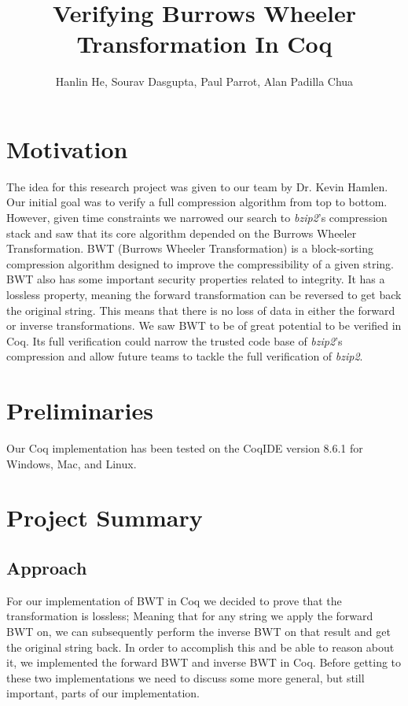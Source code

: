 \documentclass[11pt,letterpaper,]{article}
\title{Verifying Burrows Wheeler Transformation In Coq}
\author{Hanlin He, Sourav Dasgupta, Paul Parrot, Alan Padilla Chua}
\begin{document}
\maketitle

\section{Motivation}

The idea for this research project was given to our team by Dr. Kevin Hamlen.
Our initial goal was to verify a full compression algorithm from top to bottom.
However, given time constraints we narrowed our search to \emph{bzip2}'s
compression stack and saw that its core algorithm depended on the Burrows
Wheeler Transformation\cite{bzip2}. BWT (Burrows Wheeler Transformation) is a
block-sorting compression algorithm designed to improve the compressibility of
a given string. BWT also has some important security properties related to
integrity. It has a lossless property, meaning the forward transformation can
be reversed to get back the original string. This means that there is no loss
of data in either the forward or inverse transformations. We saw BWT to be of
great potential to be verified in Coq. Its full verification could narrow the
trusted code base of \emph{bzip2}'s compression and allow future teams to
tackle the full verification of \emph{bzip2}.

\section{Preliminaries}

Our Coq implementation has been tested on the CoqIDE version 8.6.1 for Windows,
Mac, and Linux.

\section{Project Summary}

\subsection{Approach}

For our implementation of BWT in Coq we decided to prove that the
transformation is lossless; Meaning that for any string we apply the forward
BWT on, we can subsequently perform the inverse BWT on that result and get the
original string back. In order to accomplish this and be able to reason about
it, we implemented the forward BWT and inverse BWT in Coq. Before getting to
these two implementations we need to discuss some more general, but still
important, parts of our implementation.
\end{document}
